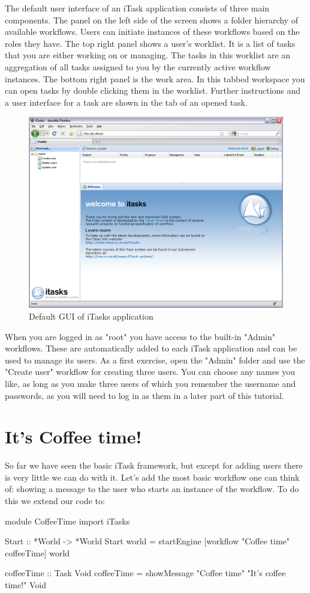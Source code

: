 \documentclass[a4paper,11pt]{article}
\begin{document}
The default user interface of an iTask application consists of three main components. The panel on the left side of the screen shows a folder hierarchy of available workflows. Users can initiate instances of these workflows based on the roles they have. The top right panel shows a user's worklist. It is a list of tasks that you are either working on or managing. The tasks in this worklist are an aggregation of all tasks assigned to you by the currently active workflow instances. The bottom right panel is the work area. In this tabbed workspace you can open tasks by double clicking them in the worklist. Further instructions and a user interface for a task are shown in the tab of an opened task.
\begin{figure}[h]
\centerline{\includegraphics[width=12cm]{GettingStarted-img/empty-browser.png}}
\caption{Default GUI of iTasks application} \label{empty-browser}
\end{figure}

When you are logged in as "root" you have access to the built-in "Admin" workflows. These are automatically added to each iTask application and can be used to manage its users. As a first exercise, open the "Admin" folder and use the "Create user" workflow for creating three users. You can choose any names you like, as long as you make three users of which you remember the username and passwords, as you will need to log in as them in a later part of this tutorial.

\section{It's Coffee time!}
So far we have seen the basic iTask framework, but except for adding users there is very little we can do with it. Let's add the most basic workflow one can think of: showing a message to the user who starts an instance of the workflow.
To do this we extend our code to:
\begin{CleanCode}
module CoffeeTime
import iTasks

Start :: *World -> *World
Start world = startEngine [workflow "Coffee time" coffeeTime] world

coffeeTime :: Task Void
coffeeTime = showMessage "Coffee time" "It's coffee time!" Void
\end{CleanCode}
\end{document}
